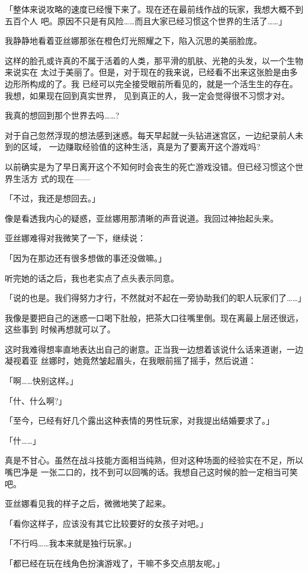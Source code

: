 \documentclass[11pt]{book}
\begin{document}
「整体来说攻略的速度已经慢下来了。现在还在最前线作战的玩家，我想大概不到五百个人
吧。原因不只是有风险……而且大家已经习惯这个世界的生活了……」

我静静地看着亚丝娜那张在橙色灯光照耀之下，陷入沉思的美丽脸庞。

这样的脸孔或许真的不属于活着的人类，那平滑的肌肤、光艳的头发，以一个生物来说实在
太过于美丽了。但是，对于现在的我来说，已经看不出来这张脸是由多边形所构成的了。我
已经可以完全接受眼前所看见的，就是一个活生生的存在。我想，如果现在回到真实世界，
见到真正的人，我一定会觉得很不习惯才对。

我真的想回到那个世界去吗……?

对于自己忽然浮现的想法感到迷惑。每天早起就一头钻进迷宫区，一边纪录前人未到的区域，
一边赚取经验值的这种生活，真是为了要离开这个游戏吗?

以前确实是为了早日离开这个不知何时会丧生的死亡游戏没错。但已经习惯这个世界生活方
式的现在——

「不过，我还是想回去。」

像是看透我内心的疑惑，亚丝娜用那清晰的声音说道。我回过神抬起头来。

亚丝娜难得对我微笑了一下，继续说：

「因为在那边还有很多想做的事还没做嘛。」

听完她的话之后，我也老实点了点头表示同意。

「说的也是。我们得努力才行，不然就对不起在一旁协助我们的职人玩家们了……」

我像是要把自己的迷惑一口喝下肚般，把茶大口往嘴里倒。现在离最上层还很远，这些事到
时候再想就可以了。

这时我难得想率直地表达出自己的谢意。正当我一边想着该说什么话来道谢，一边凝视着亚
丝娜时，她竟然皱起眉头，在我眼前摇了摇手，然后说道：

「啊……快别这样。」

「什、什么啊?」

「至今，已经有好几个露出这种表情的男性玩家，对我提出结婚要求了。」

「什……」

真是不甘心。虽然在战斗技能方面相当纯熟，但对这种场面的经验实在不足，所以嘴巴净是
一张二口的，找不到可以回嘴的话。我想自己这时候的脸一定相当可笑吧。

亚丝娜看见我的样子之后，微微地笑了起来。

「看你这样子，应该没有其它比较要好的女孩子对吧。」

「不行吗……我本来就是独行玩家。」

「都已经在玩在线角色扮演游戏了，干嘛不多交点朋友呢。」
\end{document}
